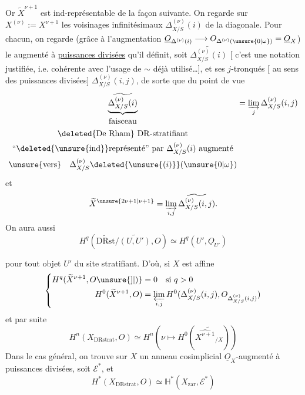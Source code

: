 Or $\widetilde X^{\nu+1}$ est ind-représentable de la façon suivante. On regarde sur $X^{(\nu)}:=X^{\nu+1}$ les voisinages infinitésimaux $\Delta_{X/S}^{(\nu)}(i)$ de la diagonale. Pour chacun, on regarde (grâce à l'augmentation $\underline O_{\Delta^{(\nu)}(i)}\longrightarrow O_{\Delta^{(\nu)}(\unsure{0|\omega})}=\underline O_X$) le  augmenté à \uline{puissances divisées} qu'il définit, soit $\widetilde{\Delta_{X/S}^{(\nu)}(i)}$ [ c'est une notation  justifiée, i.e. cohérente avec  l'usage de $\sim$ déjà utilisé\ldots], et ses $j$-tronqués [   au sens des puissances divisées] $\Delta_{X/S}^{(\nu)}(i,j)$, de sorte que du point de vue
\[
\underbrace{\widetilde{\Delta_{X/S}^{(\nu)}(i)}}_{\begin{gathered}
\text{faisceau}\\
\deleted{\text{De Rham}}\ \mathrm{DR}\text{-stratifiant}\\
\text{``\deleted{\unsure{ind}}représenté'' par }\Delta_{X/S}^{(\nu)}(i)\text{ augmenté}\\
\text{\unsure{vers}}\quad\Delta_{X/S}^{(\nu)}\deleted{\unsure{(i)}}(\unsure{0|\omega})
\end{gathered}}
=\varinjlim_j\Delta_{X/S}^{(\nu)}(i,j)
\]
et
\[
\widetilde X^{\unsure{2\nu+1|\nu+1}}=\varinjlim_{i,j}\widetilde{\Delta_{X/S}^{(\nu)}(i,j)}.
\]
On aura aussi
\[
H^q(\widetilde{\mathrm{DRst}}/\widetilde{(U,U')},O)\simeq H^q(U',\underline O_{U'})
\]


pour tout objet $U'$ du site stratifiant. D'où, si $X$ est affine
\[
\left\{\begin{aligned}
H^q(\widetilde X^{\nu+1},O\unsure{]|)}&=0\quad\text{si }q>0\\
H^0(\widetilde X^{\nu+1},O)&=\varprojlim_{i,j}H^0(\Delta_{X/S}^{(\nu)}(i,j),O_{\Delta_{X/S}^{(\nu)}(i,j)})
\end{aligned}\right.
\]
et par suite
\[
H^n(X_{\mathrm{DRstrat}},O)\simeq H^n(\nu\longmapsto H^0(\widetilde{\widehat{X^{\nu+1}}_{/X}}))
\]
Dans le cas général, on trouve sur $X$ un anneau cosimplicial $\underline O_X$-augmenté à puissances divisées, soit $\mathcal E^*$, et
\[
H^*(X_{\mathrm{DRstrat}},O)\simeq\mathbb H^*(X_{\mathrm{zar}},\mathcal E^*)
\]


